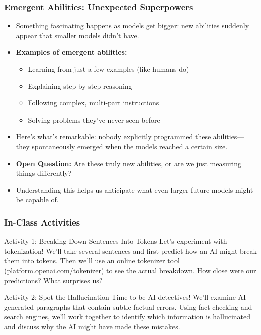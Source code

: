 \documentclass{beamer}
\begin{document}
\begin{frame}
    \frametitle{Emergent Abilities: Unexpected Superpowers}
    \begin{itemize}
        \item Something fascinating happens as models get bigger: new abilities suddenly appear that smaller models didn't have.
        \item \textbf{Examples of emergent abilities:}
        \begin{itemize}
            \item Learning from just a few examples (like humans do)
            \item Explaining step-by-step reasoning
            \item Following complex, multi-part instructions
            \item Solving problems they've never seen before
        \end{itemize}
        \item Here's what's remarkable: nobody explicitly programmed these abilities—they spontaneously emerged when the models reached a certain size.
        \item \textbf{Open Question:} Are these truly new abilities, or are we just measuring things differently?
        \item Understanding this helps us anticipate what even larger future models might be capable of.
    \end{itemize}
\end{frame}

\begin{frame}
    \frametitle{In-Class Activities}
    \begin{block}{Activity 1: Breaking Down Sentences Into Tokens}
        Let's experiment with tokenization! We'll take several sentences and first predict how an AI might break them into tokens. Then we'll use an online tokenizer tool (platform.openai.com/tokenizer) to see the actual breakdown. How close were our predictions? What surprises us?
    \end{block}
    \begin{block}{Activity 2: Spot the Hallucination}
        Time to be AI detectives! We'll examine AI-generated paragraphs that contain subtle factual errors. Using fact-checking and search engines, we'll work together to identify which information is hallucinated and discuss why the AI might have made these mistakes.
    \end{block}
\end{frame}
\end{document}
